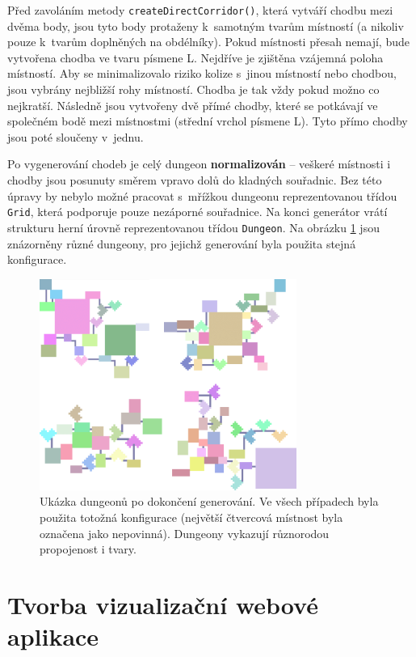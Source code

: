 Před zavoláním metody \texttt{createDirectCorridor()}, která vytváří chodbu mezi dvěma body, jsou tyto body protaženy k~samotným tvarům místností (a nikoliv pouze k~tvarům doplněných na obdélníky).
Pokud místnosti přesah nemají, bude vytvořena chodba ve tvaru písmene L.
Nejdříve je zjištěna vzájemná poloha místností.
Aby se minimalizovalo riziko kolize s~jinou místností nebo chodbou, jsou vybrány nejbližší rohy místností.
Chodba je tak vždy pokud možno co nejkratší.
Následně jsou vytvořeny dvě přímé chodby, které se potkávají ve společném bodě mezi místnostmi (střední vrchol písmene L).
Tyto přímo chodby jsou poté sloučeny v~jednu.
\par
Po vygenerování chodeb je celý dungeon \textbf{normalizován} -- veškeré místnosti i chodby jsou posunuty směrem vpravo dolů do kladných souřadnic.
Bez této úpravy by nebylo možné pracovat s~mřížkou dungeonu reprezentovanou třídou \texttt{Grid}, která podporuje pouze nezáporné souřadnice.
Na konci generátor vrátí strukturu herní úrovně reprezentovanou třídou \texttt{Dungeon}.
Na obrázku \ref{img:dungeon_example} jsou znázorněny různé dungeony, pro jejichž generování byla použita stejná konfigurace.
\begin{figure}[ht]
    \centering
    \includegraphics[width=0.75\textwidth]{obrazky/dungeon_example.png}
    \caption{Ukázka dungeonů po dokončení generování. Ve všech případech byla použita totožná konfigurace (největší čtvercová místnost byla označena jako nepovinná). Dungeony vykazují různorodou propojenost i tvary.}
    \label{img:dungeon_example}
\end{figure}


\chapter{Tvorba vizualizační webové aplikace}
\label{ch:web} %

